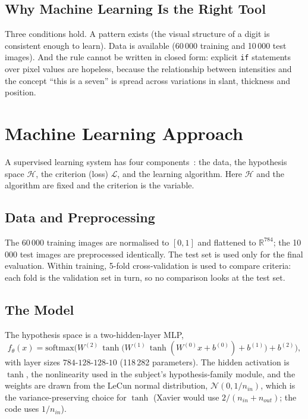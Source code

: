 \documentclass[11pt]{article}
\newcommand{\Lc}{\mathcal{L}}
\newcommand{\Hyp}{\mathcal{H}}
\begin{document}
\subsection{Why Machine Learning Is the Right Tool}

Three conditions hold. A pattern exists (the visual structure of a digit is consistent enough
to learn). Data is available (60\,000 training and 10\,000 test images). And the rule cannot be
written in closed form: explicit \texttt{if} statements over pixel values are hopeless, because
the relationship between intensities and the concept ``this is a seven'' is spread across
variations in slant, thickness and position.

\section{Machine Learning Approach}
\label{sec:approach}

A supervised learning system has four components~\parencite{goodfellow2016}: the data, the
hypothesis space $\Hyp$, the criterion (loss) $\Lc$, and the learning algorithm. Here $\Hyp$
and the algorithm are fixed and the criterion is the variable.

\subsection{Data and Preprocessing}

The 60\,000 training images are normalised to $[0,1]$ and flattened to $\mathbb{R}^{784}$; the
10\,000 test images are preprocessed identically. The test set is used only for the final
evaluation. Within training, 5-fold cross-validation is used to compare criteria: each fold is
the validation set in turn, so no comparison looks at the test set.

\subsection{The Model}

The hypothesis space is a two-hidden-layer MLP,
\begin{equation}
f_\theta(x) = \mathrm{softmax}\!\Big(W^{(2)}\,\tanh\big(W^{(1)}\,\tanh(W^{(0)} x + b^{(0)}) + b^{(1)}\big) + b^{(2)}\Big),
\end{equation}
with layer sizes $784\text{-}128\text{-}128\text{-}10$ (118\,282 parameters). The hidden
activation is $\tanh$, the nonlinearity used in the subject's hypothesis-family module, and the
weights are drawn from the LeCun normal distribution, $\mathcal{N}(0,1/n_{in})$, which is the
variance-preserving choice for $\tanh$ (Xavier would use $2/(n_{in}+n_{out})$; the code uses
$1/n_{in}$).
\end{document}
